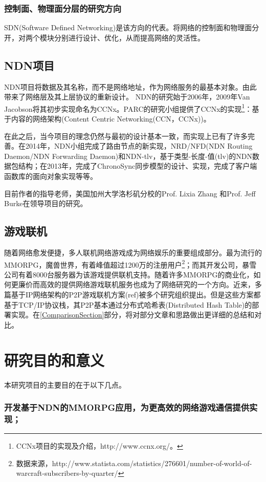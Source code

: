 \subsubsection{控制面、物理面分层的研究方向}
SDN(Software Defined Networking)是该方向的代表。将网络的控制面和物理面分开，对两个模块分别进行设计、优化，从而提高网络的灵活性。
\subsection{NDN项目}
\par
NDN项目将数据及其名称，而不是网络地址，作为网络服务的最基本对象。由此带来了网络层及其上层协议的重新设计。
NDN的研究始于2006年，2009年Van Jacobson将其初步实现命名为CCNx\cite{NDNRefOriginal}。PARC的研究小组提供了CCNx的实现\footnote{CCNx项目的实现及介绍，http://www.ccnx.org/。}：基于内容的网络架构(Content Centric Networking(CCN，CCNx))。
\par
在此之后，当今项目的理念仍然与最初的设计基本一致，而实现上已有了许多完善。在2014年，NDN小组完成了路由节点的新实现，NRD/NFD(NDN Routing Daemon/NDN Forwarding Daemon)和NDN-tlv，基于类型-长度-值(tlv)的NDN数据包结构；在2013年，完成了ChronoSync同步模型的设计、实现，完成了客户端函数库的面向对象实现等等。
\par
目前作者的指导老师，美国加州大学洛杉矶分校的Prof. Lixia Zhang 和Prof. Jeff Burke在领导项目的研究。
\subsection{游戏联机}
\setcounter{subsubsection}{0}
\par
随着网络愈发便捷，多人联机网络游戏成为网络娱乐的重要组成部分。最为流行的MMORPG，魔兽世界，有着峰值超过1200万的注册用户\footnote{数据来源，http://www.statista.com/statistics/276601/number-of-world-of-warcraft-subscribers-by-quarter/}；而其开发公司，暴雪公司有着8000台服务器为该游戏提供联机支持。随着许多MMORPG的商业化，如何更廉价而高效的提供网络游戏联机服务也成为了网络研究的一个方向。近来，多篇基于IP网络架构的P2P游戏联机方案(ref)被多个研究组织提出。但是这些方案都基于TCP/IP协议栈，其P2P基本通过分布式哈希表(Distributed Hash Table)的部署实现。在\ref{ComparisonSection}部分，将对部分文章和思路做出更详细的总结和对比。
\section{研究目的和意义}
\par
本研究项目的主要目的在于以下几点。
\subsubsection{开发基于NDN的MMORPG应用，为更高效的网络游戏通信提供实现；}
